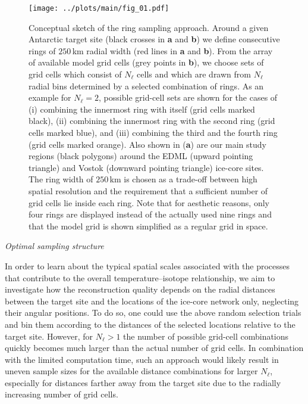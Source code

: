 \documentclass[cp, manuscript]{copernicus}
\begin{document}
\begin{figure}[t]%
\centering
\texttt{[image: ../plots/main/fig\_01.pdf]}
\caption[Conceptual approach]{%
  Conceptual sketch of the ring sampling approach. Around a given Antarctic
  target site (black crosses in \textbf{a} and \textbf{b}) we define
  consecutive rings of $250$\,km radial width (red lines in \textbf{a} and
  \textbf{b}). From the array of available model grid cells (grey points in
  \textbf{b}), we choose sets of grid cells which consist of $N_{\ell}$ cells
  and which are drawn from $N_{\ell}$ radial bins determined by a selected
  combination of rings. As an example for $N_{\ell}=2$, possible grid-cell sets
  are shown for the cases of (i) combining the innermost ring with itself (grid
  cells marked black), (ii) combining the innermost ring with the second ring
  (grid cells marked blue), and (iii) combining the third and the fourth ring
  (grid cells marked orange). Also shown in (\textbf{a}) are our main study
  regions (black polygons) around the EDML (upward pointing triangle) and Vostok
  (downward pointing triangle) ice-core sites. The ring width of $250$\,km is
  chosen as a trade-off between high spatial resolution and the requirement that
  a sufficient number of grid cells lie inside each ring. Note that for
  aesthetic reasons, only four rings are displayed instead of the actually used
  nine rings and that the model grid is shown simplified as a regular grid in
  space.}
\label{fig:concept}%
\end{figure}%

\noindent
\emph{Optimal sampling structure}

\noindent
In order to learn about the typical spatial scales associated with the processes
that contribute to the overall temperature--isotope relationship, we aim to
investigate how the reconstruction quality depends on the radial distances
between the target site and the locations of the ice-core network only,
neglecting their angular positions. To do so, one could use the above random
selection trials and bin them according to the distances of the selected
locations relative to the target site. However, for $N_{\ell}>1$ the number of
possible grid-cell combinations quickly becomes much larger than the actual
number of grid cells. In combination with the limited computation time, such an
approach would likely result in uneven sample sizes for the available distance
combinations for larger $N_{\ell}$, especially for distances farther away from
the target site due to the radially increasing number of grid cells.
\end{document}
